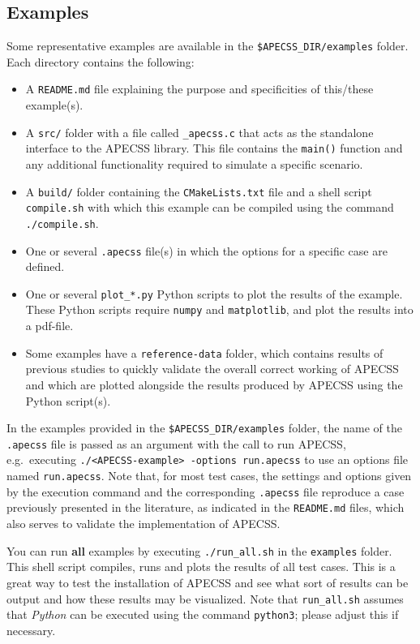 \subsection{Examples}

Some representative examples are available in the {\tt \$APECSS\_DIR/examples} folder. Each directory contains the following:\vspace{-1em}
\begin{itemize}[noitemsep]
  \item A {\tt README.md} file explaining the purpose and specificities of this/these example(s).
  \item A {\tt src/} folder with a file called {\tt *\_apecss.c} that acts as the standalone interface to the APECSS library. This file contains the {\tt main()} function and any additional functionality required to simulate a specific scenario.
  \item A {\tt build/} folder containing the {\tt CMakeLists.txt} file and a shell script {\tt compile.sh} with which this example can be compiled using the command {\tt ./compile.sh}.
  \item One or several {\tt *.apecss} file(s) in which the options for a specific case are defined.
  \item One or several {\tt plot\_*.py} Python scripts to plot the results of the example. These Python scripts require {\tt numpy} and {\tt matplotlib}, and plot the results into a pdf-file. 
  \item Some examples have a {\tt reference-data} folder, which contains results of previous studies to quickly validate the overall correct working of APECSS and which are plotted alongside the results produced by APECSS using the Python script(s).
\end{itemize}

In the examples provided in the {\tt \$APECSS\_DIR/examples} folder, the name of the  {\tt *.apecss} file is passed as an argument with the call to run APECSS, e.g.~executing {\tt ./<APECSS-example> -options run.apecss} to use an options file named {\tt run.apecss}. Note that, for most test cases, the settings and options given by the execution command and the corresponding {\tt *.apecss} file reproduce a case previously presented in the literature, as indicated in the {\tt README.md} files, which also serves to validate the implementation of APECSS.

You can run \textbf{all} examples by executing {\tt ./run\_all.sh} in the {\tt examples} folder. This shell script compiles, runs and plots the results of all test cases. This is a great way to test the installation of APECSS and see what sort of results can be output and how these results may be visualized. Note that {\tt run\_all.sh} assumes that \textit{Python} can be executed using the command {\tt python3}; please adjust this if necessary.

